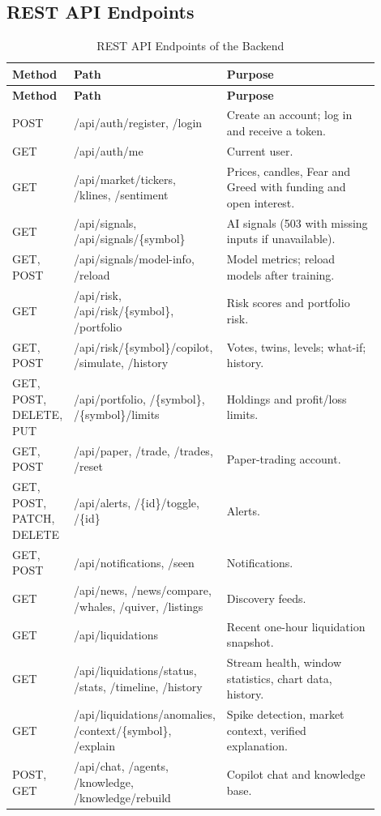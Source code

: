 \subsection{REST API Endpoints}
{\renewcommand{\arraystretch}{1.2}\small
\begin{longtable}{|p{0.1\linewidth}|p{0.38\linewidth}|p{0.42\linewidth}|}
\caption{REST API Endpoints of the Backend}\label{tab:endpoints}\\\hline
\textbf{Method} & \textbf{Path} & \textbf{Purpose}\\\hline\endfirsthead
\hline\textbf{Method} & \textbf{Path} & \textbf{Purpose}\\\hline\endhead
POST & /api/auth/register, /login & Create an account; log in and receive a token.\\\hline
GET & /api/auth/me & Current user.\\\hline
GET & /api/market/tickers, /klines, /sentiment & Prices, candles, Fear and Greed with funding and open interest.\\\hline
GET & /api/signals, /api/signals/\{symbol\} & AI signals (503 with missing inputs if unavailable).\\\hline
GET, POST & /api/signals/model-info, /reload & Model metrics; reload models after training.\\\hline
GET & /api/risk, /api/risk/\{symbol\}, /portfolio & Risk scores and portfolio risk.\\\hline
GET, POST & /api/risk/\{symbol\}/copilot, /simulate, /history & Votes, twins, levels; what-if; history.\\\hline
GET, POST, DELETE, PUT & /api/portfolio, /\{symbol\}, /\{symbol\}/limits & Holdings and profit/loss limits.\\\hline
GET, POST & /api/paper, /trade, /trades, /reset & Paper-trading account.\\\hline
GET, POST, PATCH, DELETE & /api/alerts, /\{id\}/toggle, /\{id\} & Alerts.\\\hline
GET, POST & /api/notifications, /seen & Notifications.\\\hline
GET & /api/news, /news/compare, /whales, /quiver, /listings & Discovery feeds.\\\hline
GET & /api/liquidations & Recent one-hour liquidation snapshot.\\\hline
GET & /api/liquidations/status, /stats, /timeline, /history & Stream health, window statistics, chart data, history.\\\hline
GET & /api/liquidations/anomalies, /context/\{symbol\}, /explain & Spike detection, market context, verified explanation.\\\hline
POST, GET & /api/chat, /agents, /knowledge, /knowledge/rebuild & Copilot chat and knowledge base.\\\hline
\end{longtable}}

